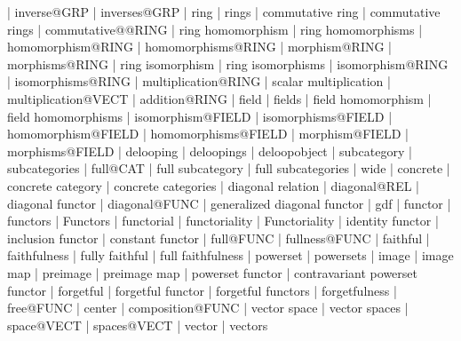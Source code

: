     |   inverse@GRP
    |   inverses@GRP
    |   ring
    |   rings
    |   commutative ring
    |   commutative rings
    |   commutative@@RING
    |   ring homomorphism
    |   ring homomorphisms
    |   homomorphism@RING
    |   homomorphisms@RING
    |   morphism@RING
    |   morphisms@RING
    |   ring isomorphism
    |   ring isomorphisms
    |   isomorphism@RING
    |   isomorphisms@RING
    |   multiplication@RING
    |   scalar multiplication
    |   multiplication@VECT
    |   addition@RING
    |   field
    |   fields
    |   field homomorphism
    |   field homomorphisms
    |   isomorphism@FIELD
    |   isomorphisms@FIELD
    |   homomorphism@FIELD
    |   homomorphisms@FIELD
    |   morphism@FIELD
    |   morphisms@FIELD
    |   delooping
    |   deloopings
    |   deloopobject
    |   subcategory
    |   subcategories
    |   full@CAT
    |   full subcategory
    |   full subcategories
    |   wide
    |   concrete
    |   concrete category
    |   concrete categories
    |   diagonal relation
    |   diagonal@REL
    |   diagonal functor
    |   diagonal@FUNC
    |   generalized diagonal functor
    |   gdf
    |   functor
    |   functors
    |   Functors
    |   functorial
    |   functoriality
    |   Functoriality
    |   identity functor
    |   inclusion functor
    |   constant functor
    |   full@FUNC
    |   fullness@FUNC
    |   faithful
    |   faithfulness
    |   fully faithful
    |   full faithfulness
    |   powerset
    |   powersets
    |   image
    |   image map
    |   preimage
    |   preimage map
    |   powerset functor
    |   contravariant powerset functor
    |   forgetful
    |   forgetful functor
    |   forgetful functors
    |   forgetfulness
    |   free@FUNC
    |   center
    |   composition@FUNC
    |   vector space
    |   vector spaces
    |   space@VECT
    |   spaces@VECT
    |   vector
    |   vectors
